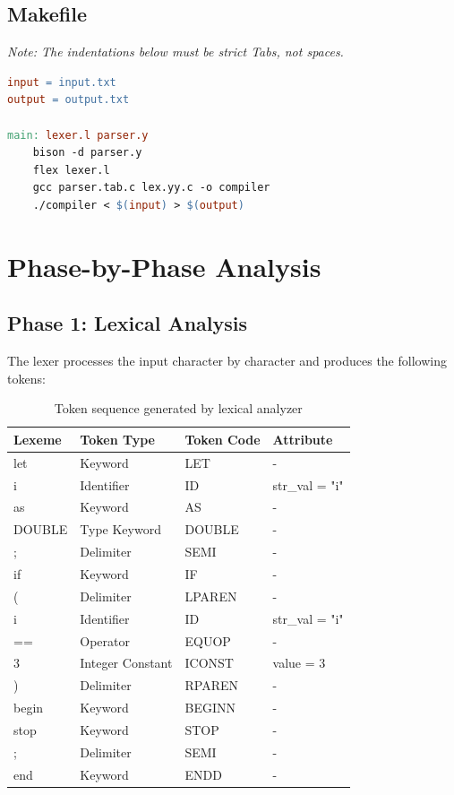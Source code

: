 \documentclass[12pt,a4paper]{article}
\begin{document}
\subsection{Makefile}
\textit{Note: The indentations below must be strict Tabs, not spaces.}

\begin{lstlisting}[language=make, caption={Build automation}]
input = input.txt
output = output.txt

main: lexer.l parser.y
	bison -d parser.y
	flex lexer.l
	gcc parser.tab.c lex.yy.c -o compiler
	./compiler < $(input) > $(output)
\end{lstlisting}

\section{Phase-by-Phase Analysis}

\subsection{Phase 1: Lexical Analysis}

The lexer processes the input character by character and produces the following tokens:

\begin{table}[H]
\centering
\begin{tabular}{|l|l|l|l|}
\hline
\textbf{Lexeme} & \textbf{Token Type} & \textbf{Token Code} & \textbf{Attribute} \\
\hline
let & Keyword & LET & - \\
i & Identifier & ID & str\_val = "i" \\
as & Keyword & AS & - \\
DOUBLE & Type Keyword & DOUBLE & - \\
; & Delimiter & SEMI & - \\
if & Keyword & IF & - \\
( & Delimiter & LPAREN & - \\
i & Identifier & ID & str\_val = "i" \\
== & Operator & EQUOP & - \\
3 & Integer Constant & ICONST & value = 3 \\
) & Delimiter & RPAREN & - \\
begin & Keyword & BEGINN & - \\
stop & Keyword & STOP & - \\
; & Delimiter & SEMI & - \\
end & Keyword & ENDD & - \\
\hline
\end{tabular}
\caption{Token sequence generated by lexical analyzer}
\end{table}
\end{document}

